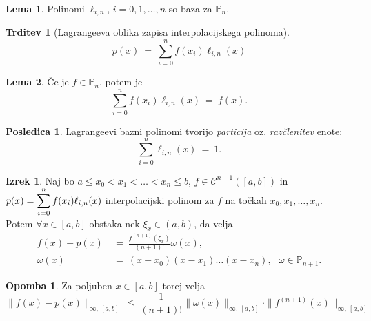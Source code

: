 \documentclass[11pt]{article}
\newcommand{\p}{\mathbb{P}}
\newcommand{\C}{\mathcal{C}}
\theoremstyle{definition}
\theoremstyle{definition}
\newtheorem{lema}{Lema}[section]
\newtheorem{trditev}{Trditev}[section]
\newtheorem{izrek}{Izrek}
\newtheorem*{posledica}{Posledica}
\newtheorem*{opomba}{Opomba}
\begin{document}
\begin{lema}

Polinomi $\ell_{i, n}$, $i = 0, 1, \ldots, n$ so baza za $\p_n$.

\end{lema}
\vspace{0.5cm}

\begin{trditev}[Lagrangeeva oblika zapisa interpolacijskega polinoma]

$$p(x) ~=~ \sum_{i=0}^n f(x_i) \ell_{i, n}(x)$$

\end{trditev}
\vspace{0.5cm}

\begin{lema}

Če je $f \in \p_n$, potem je
$$\sum_{i=0}^n f(x_i) \ell_{i, n}(x) ~=~ f(x).$$

\end{lema}
\vspace{0.5cm}

\begin{posledica}

Lagrangeevi bazni polinomi tvorijo \textit{particija} oz. \textit{razčlenitev} enote:
$$\sum_{i=0}^n \ell_{i,n}(x) ~=~ 1.$$

\end{posledica}
\vspace{0.5cm}

\begin{izrek}

Naj bo $a \leq x_0 < x_1 < \ldots < x_n \leq b$, $f \in \C^{n+1}([a, b])$ in \\$p(x) = \mathlarger{\sum_{i=0}^n f(x_i) \ell_{i, n}(x)}$ interpolacijski polinom za $f$ na točkah $x_0, x_1, \ldots, x_n$. Potem $\forall x \in [a, b]$ obstaka nek $\xi_x \in (a, b)$, da velja
\begin{align*}
f(x) - p(x) ~&=~ \frac{f^{(n+1)}(\xi_x)}{(n+1)!} \omega(x), \\
\omega(x) ~&=~ (x-x_0)(x-x_1)\ldots(x-x_n), ~~~\omega \in \p_{n+1}.
\end{align*}

\end{izrek}
\vspace{0.5cm}

\begin{opomba}

Za poljuben $x \in  [a, b]$ torej velja
$$\|f(x) - p(x)\|_{\infty,~[a, b]} ~\leq~ \frac{1}{(n+1)!} \|\omega(x)\|_{\infty,~[a, b]} \cdot \|f^{(n+1)}(x)\|_{\infty,~[a, b]}$$

\end{opomba}
\vspace{0.5cm}
\end{document}
